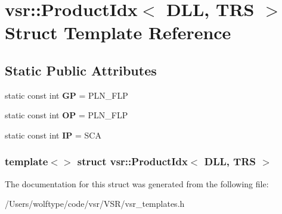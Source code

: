 \hypertarget{structvsr_1_1_product_idx_3_01_d_l_l_00_01_t_r_s_01_4}{\section{vsr\-:\-:Product\-Idx$<$ D\-L\-L, T\-R\-S $>$ Struct Template Reference}
\label{structvsr_1_1_product_idx_3_01_d_l_l_00_01_t_r_s_01_4}
}
\subsection*{Static Public Attributes}
\begin{DoxyCompactItemize}
\item 
\hypertarget{structvsr_1_1_product_idx_3_01_d_l_l_00_01_t_r_s_01_4_a2cc27562b8cb99bb8c0614afdc0eb883}{static const int {\bfseries G\-P} = P\-L\-N\-\_\-\-F\-L\-P}\label{structvsr_1_1_product_idx_3_01_d_l_l_00_01_t_r_s_01_4_a2cc27562b8cb99bb8c0614afdc0eb883}

\item 
\hypertarget{structvsr_1_1_product_idx_3_01_d_l_l_00_01_t_r_s_01_4_a3691631422aeed01559158a349d69067}{static const int {\bfseries O\-P} = P\-L\-N\-\_\-\-F\-L\-P}\label{structvsr_1_1_product_idx_3_01_d_l_l_00_01_t_r_s_01_4_a3691631422aeed01559158a349d69067}

\item 
\hypertarget{structvsr_1_1_product_idx_3_01_d_l_l_00_01_t_r_s_01_4_a688ca3e3b0c82fd276a9ebab97651902}{static const int {\bfseries I\-P} = S\-C\-A}\label{structvsr_1_1_product_idx_3_01_d_l_l_00_01_t_r_s_01_4_a688ca3e3b0c82fd276a9ebab97651902}

\end{DoxyCompactItemize}
\subsubsection*{template$<$$>$ struct vsr\-::\-Product\-Idx$<$ D\-L\-L, T\-R\-S $>$}



The documentation for this struct was generated from the following file\-:\begin{DoxyCompactItemize}
\item 
/\-Users/wolftype/code/vsr/\-V\-S\-R/vsr\-\_\-templates.\-h\end{DoxyCompactItemize}
